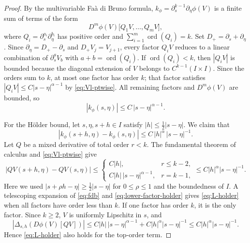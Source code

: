 \documentclass[11pt,reqno]{amsart}
\theoremstyle{plain}
\theoremstyle{definition}
\numberwithin{equation}{section}
\newcommand{\p}{\partial}
\newcommand{\abs}[1]{\left\lvert #1 \right\rvert}
\begin{document}
\begin{proof}
By the multivariable Faà di Bruno formula,
$k_\phi = \p_s^{k-1}\p_\eta\phi(V)$ is a finite sum of
terms of the form
\begin{equation}\label{eq:fdb}
    D^m\phi(V)\bigl[Q_1V,\ldots,Q_mV\bigr],
\end{equation}
where $Q_i=\p_s^{a_i}\p_\eta^{b_i}$ has positive order and
$\sum_{i=1}^m\operatorname{ord}(Q_i)=k$.
Set $D_+=\p_s+\p_\eta$. Since
$\p_\eta=D_+-\p_s$ and $D_+V_j=V_{j+1}$, every factor
$Q_iV$ reduces to
a linear combination of $\p_s^a V_b$ with $a+b=\operatorname{ord}(Q_i)$.
If $\operatorname{ord}(Q_i)<k$, then $\abs{Q_iV}$ is
bounded because the diagonal extension of $V$ belongs to
$C^{k-1}(I\times I)$.
Since the orders sum to $k$, at most one factor has order $k$; that
factor satisfies $\abs{Q_iV}\le C\abs{s-\eta}^{\alpha-1}$ by
\eqref{eq:Vl-ptwise}. All remaining factors and $D^m\phi(V)$ are bounded,
so
\begin{equation}\label{eq:L-ptwise}
    \abs{k_\phi(s,\eta)} \le C\,\abs{s-\eta}^{\alpha-1}.
\end{equation}

For the H\"older bound, let $s,\eta,s+h\in I$ satisfy
$\abs{h}\le\tfrac{1}{2}\abs{s-\eta}$. We claim that
\begin{equation}\label{eq:L-holder}
    \abs{k_\phi(s+h,\eta)-k_\phi(s,\eta)} \le C\,\abs{h}^\alpha\,\abs{s-\eta}^{-1}.
\end{equation}
Let $Q$ be a mixed derivative of total order $r<k$. The
fundamental theorem of calculus and \eqref{eq:Vl-ptwise} give
\begin{equation}\label{eq:lower-factor-holder}
    \abs{QV(s+h,\eta)-QV(s,\eta)}
    \le
    \begin{cases}
        C\abs h, & r\le k-2,\\
        C\abs h\,\abs{s-\eta}^{\alpha-1}, & r=k-1,
    \end{cases}
    \le C\abs h^\alpha\abs{s-\eta}^{-1}.
\end{equation}
Here we used
$\abs{s+\rho h-\eta}\ge\frac12\abs{s-\eta}$ for
$0\le\rho\le1$ and the boundedness of $I$.
A telescoping expansion of \eqref{eq:fdb} and
\eqref{eq:lower-factor-holder} gives \eqref{eq:L-holder} when all factors
have order less than $k$. If one factor has order $k$, it is the only
factor. Since $k\ge2$, $V$ is uniformly Lipschitz in $s$, and
\begin{equation}
    \abs{\Delta_{s,h}\!\left(D\phi(V)[QV]\right)}
    \le C\abs h\,\abs{s-\eta}^{\alpha-1}
    +C\abs h^\alpha\abs{s-\eta}^{-1}
    \le C\abs h^\alpha\abs{s-\eta}^{-1}.
\end{equation}
Hence \eqref{eq:L-holder} also holds for the top-order term.


\end{proof}
\end{document}

